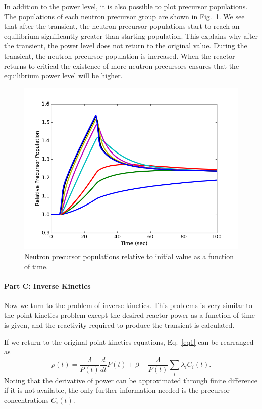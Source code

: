 \documentclass[12pt]{report}
\begin{document}
	In addition to the power level, it is also possible to plot precursor populations. The populations of each neutron precursor group are shown in Fig.~\ref{precursor}. We see that after the transient, the neutron precursor populations start to reach an equilibrium significantly greater than starting population. This explains why after the transient, the power level does not return to the original value. During the transient, the neutron precursor population is increased. When the reactor returns to critical the existence of more neutron precursors ensures that the equilibrium power level will be higher.
	
		\begin{figure}[h!]
			\begin{center}
				\includegraphics[scale=0.7]{partB_ex_precursors.png}
			\end{center}
			\caption{Neutron precursor populations relative to initial value as a function of time.}
			\label{precursor}
		\end{figure}
	
	\paragraph{Part C: Inverse Kinetics}
	Now we turn to the problem of inverse kinetics. This problems is very similar to the point kinetics problem except the desired reactor power as a function of time is given, and the reactivity required to produce the transient is calculated. 
	
	If we return to the original point kinetics equations, Eq.~\ref{eq1} can be rearranged as
	\begin{equation}
	\rho(t) = \frac{\Lambda}{P(t)} \frac{d}{dt} P(t) + \beta - \frac{\Lambda}{P(t)} \sum_i \lambda_i C_i(t). \label{eq_ike}
	\end{equation}
	Noting that the derivative of power can be approximated through finite difference if it is not available, the only further information needed is the precursor concentrations $C_i(t)$.
	
\end{document}

